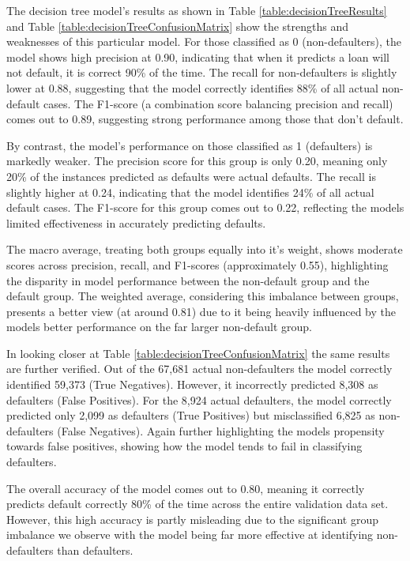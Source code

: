 \documentclass[12pt]{article}
\begin{document}
The decision tree model's results as shown in Table \ref{table:decisionTreeResults} and Table \ref{table:decisionTreeConfusionMatrix} show the strengths and weaknesses of this particular model. For those classified as 0 (non-defaulters), the model shows high precision at 0.90, indicating that when it predicts a loan will not default, it is correct 90\% of the time. The recall for non-defaulters is slightly lower at 0.88, suggesting that the model correctly identifies 88\% of all actual non-default cases. The F1-score (a combination score balancing precision and recall) comes out to 0.89, suggesting strong performance among those that don't default.

By contrast, the model's performance on those classified as 1 (defaulters) is markedly weaker. The precision score for this group is only 0.20, meaning only 20\% of the instances predicted as defaults were actual defaults. The recall is slightly higher at 0.24, indicating that the model identifies 24\% of all actual default cases. The F1-score for this group comes out to 0.22, reflecting the models limited effectiveness in accurately predicting defaults.

The macro average, treating both groups equally into it's weight, shows moderate scores across precision, recall, and F1-scores (approximately 0.55), highlighting the disparity in model performance between the non-default group and the default group. The weighted average, considering this imbalance between groups, presents a better view (at around 0.81) due to it being heavily influenced by the models better performance on the far larger non-default group.

In looking closer at Table \ref{table:decisionTreeConfusionMatrix} the same results are further verified. Out of the 67,681 actual non-defaulters the model correctly identified 59,373 (True Negatives). However, it incorrectly predicted 8,308 as defaulters (False Positives). For the 8,924 actual defaulters, the model correctly predicted only 2,099 as defaulters (True Positives) but misclassified 6,825 as non-defaulters (False Negatives). Again further highlighting the models propensity towards false positives, showing how the model tends to fail in classifying defaulters.

The overall accuracy of the model comes out to 0.80, meaning it correctly predicts default correctly 80\% of the time across the entire validation data set. However, this high accuracy is partly misleading due to the significant group imbalance we observe with the model being far more effective at identifying non-defaulters than defaulters.
\end{document}
